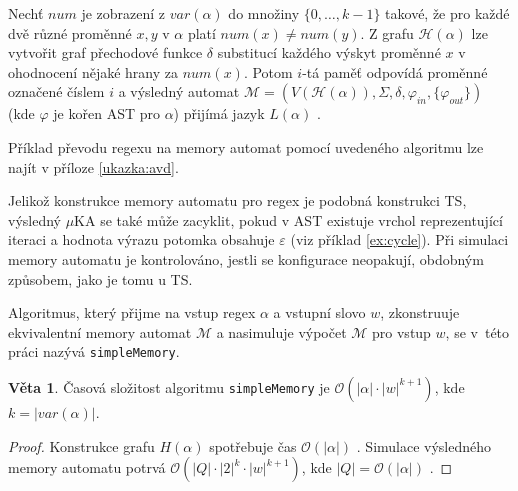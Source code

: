 \documentclass[thesis=B,czech]{FITthesis}[2019/12/23]
\theoremstyle{definition}
\newtheorem{theorem}{Věta}[chapter]
\begin{document}
Nechť $num$ je zobrazení z $var(\alpha)$ do množiny $\{0, \dots, k-1\}$ takové, že pro každé dvě různé proměnné $x, y$ v $\alpha$ platí $num(x) \ne num(y)$. Z grafu $\mathcal{H}(\alpha)$ lze vytvořit graf přechodové funkce $\delta$ substitucí každého výskyt proměnné $x$ v ohodnocení nějaké hrany za $num(x)$. Potom $i$-tá paměť odpovídá proměnné označené číslem $i$ a výsledný automat $\mathcal{M} = (V(\mathcal{H}(\alpha)), \Sigma, \delta, \varphi_{in}, \{\varphi_{out}\})$ (kde $\varphi$ je kořen AST pro $\alpha$) přijímá jazyk $L(\alpha)$ \cite[s. 5]{schmidref}.

Příklad převodu regexu na memory automat pomocí uvedeného algoritmu lze najít v příloze \ref{ukazka:avd}.

Jelikož konstrukce memory automatu pro regex je podobná konstrukci TS, výsledný $\mu$KA se také může zacyklit, pokud v AST existuje vrchol reprezentující iteraci a hodnota výrazu potomka obsahuje $\varepsilon$ (viz příklad \ref{ex:cycle}). Při simulaci memory automatu je kontrolováno, jestli se konfigurace neopakují, obdobným způsobem, jako je tomu u TS.  

Algoritmus, který přijme na vstup regex $\alpha$ a vstupní slovo $w$, zkonstruuje ekvivalentní memory automat $\mathcal{M}$ a nasimuluje výpočet $\mathcal{M}$ pro vstup $w$, se v~této práci nazývá \texttt{simpleMemory}.

\begin{theorem}\label{thm:simplemem}
Časová složitost algoritmu \texttt{simpleMemory} je $\mathcal{O}(|\alpha|\cdot|w|^{k+1})$, kde $k = |var(\alpha)|$. 
\end{theorem}
\begin{proof} Konstrukce grafu $H(\alpha)$ spotřebuje čas $\mathcal{O}(|\alpha|)$ \cite[lemma 3]{schmidref}. Simulace výsledného memory automatu potrvá $\mathcal{O}(|Q|\cdot|2|^k\cdot|w|^{k+1})$, kde $|Q| = \mathcal{O}(|\alpha|)$ \cite[lemma~2]{schmidref}.
\end{proof}

\iffalse
\end{document}
